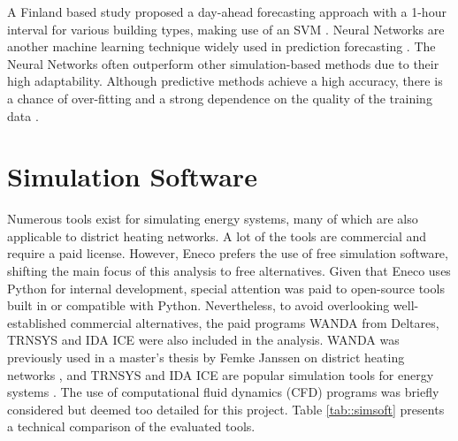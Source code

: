 A Finland based study proposed a day-ahead forecasting approach with a 1-hour interval for various building types, making use of an SVM \cite{SVMFinland}. Neural Networks are another machine learning technique widely used in prediction forecasting \cite{ZHANG199835,Hippert,FRISON2024132745}. The Neural Networks often outperform other simulation-based methods due to their high adaptability. Although predictive methods achieve a high accuracy, there is a chance of over-fitting and a strong dependence on the quality of the training data \cite{Talebi}.


\section{Simulation Software}\label{sec::simsoft}
Numerous tools exist for simulating energy systems, many of which are also applicable to district heating networks. A lot of the tools are commercial and require a paid license. However, Eneco prefers the use of free simulation software, shifting the main focus of this analysis to free alternatives. Given that Eneco uses Python for internal development, special attention was paid to open-source tools built in or compatible with Python. Nevertheless, to avoid overlooking well-established commercial alternatives, the paid programs WANDA \cite{deltaresWanda} from Deltares, TRNSYS and IDA ICE \cite{IDAICe} were also included in the analysis. WANDA was previously used in a master’s thesis by Femke Janssen on district heating networks \cite{FemkeJanssenLit}, and TRNSYS and IDA ICE are popular simulation tools for energy systems \cite{KUNTUAROVA}. The use of computational fluid dynamics (CFD) programs was briefly considered but deemed too detailed for this project. Table \ref{tab::simsoft} presents a technical comparison of the evaluated tools.

